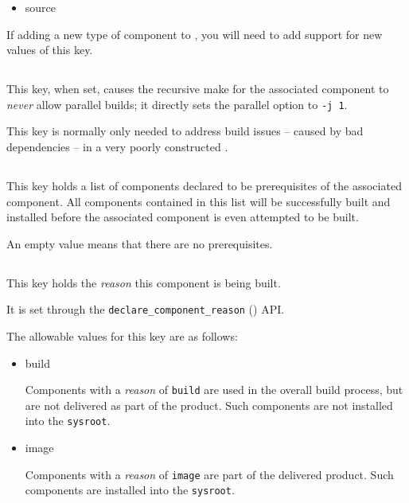 \begin{itemize}
\item source
\end{itemize}

If adding a new type of component to \lmsbw, you will need to add
support for new values of this key.


\subsection{}\label{variables:no-parallel}

This key, when set, causes the recursive make for the associated
component to \emph{never} allow parallel builds; it directly sets the
\gnumake parallel option to \texttt{-j 1}.

This key is normally only needed to address build issues -- caused by
bad dependencies -- in a very poorly constructed \makefile.


\subsection{}\label{variables:prerequisite}

This key holds a list of components declared to be prerequisites of
the associated component.  All components contained in this list will
be successfully built and installed before the associated component is
even attempted to be built.

An empty value means that there are no prerequisites.


\subsection{}\label{variables:reason}

This key holds the \emph{reason} this component is being built.

It is set through the \texttt{declare\_component\_reason}
() API.

The allowable values for this key are as follows:

\begin{itemize}
\item build

  Components with a \emph{reason} of \texttt{build} are used in the
  overall build process, but are not delivered as part of the product.
  Such components are not installed into the \texttt{sysroot}.

\item image

  Components with a \emph{reason} of \texttt{image} are part of the
  delivered product.  Such components are installed into the
  \texttt{sysroot}.

\end{itemize}

